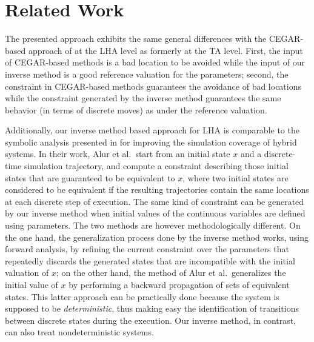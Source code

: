 \documentclass{llncs}
\begin{document}
\section{Related Work} \label{sec:related}


The presented approach exhibits the same general differences with the
CEGAR-based approach of \cite{FJK:2008} at the LHA level as formerly
at the TA level. First, the input of CEGAR-based methods is a bad
location to be avoided while the input of our inverse method is a
good reference valuation for the parameters; second, the constraint in
CEGAR-based methods guarantees the avoidance of bad locations while the
constraint generated by the inverse method guarantees the same behavior
(in terms of discrete moves) as under the reference valuation.

Additionally, our inverse method based approach for LHA is comparable
to the symbolic analysis presented in \cite{AKRS:2008} for improving
the simulation coverage of hybrid systems.  In their work, Alur et
al.~start from an initial state $x$ and a discrete-time simulation
trajectory, and compute a constraint describing those initial states
that are guaranteed to be equivalent to $x$, where two initial states
are considered to be equivalent if the resulting trajectories contain
the same locations at each discrete step of execution.  The same kind
of constraint can be generated by our inverse method when initial
values of the continuous variables are defined using parameters. The
two methods are however methodologically different.  On the one hand,
the generalization process done by the inverse method works, using
forward analysis, by refining the current constraint over the
parameters that repeatedly discards the generated states that are
incompatible with the initial valuation of $x$; on the other hand, the
method of Alur et al.~generalizes the initial value of $x$ by
performing a backward propagation of sets of equivalent states. This
latter approach can be practically done because the system is supposed
to be {\em deterministic}, thus making easy the identification of
transitions between discrete states during the execution. Our inverse
method, in contrast, can also treat nondeterministic systems.
\end{document}
